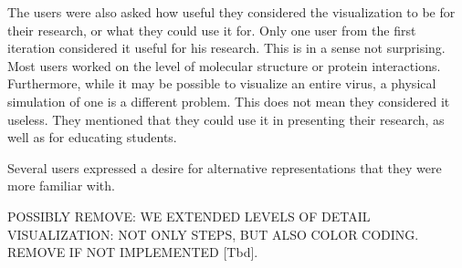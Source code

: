 \documentclass[review,journal]{vgtc}         %
\begin{document}
The users were also asked how useful they considered the visualization to be for their research, or what they could use it for. Only one user from the first iteration considered it useful for his research. This is in a sense not surprising. Most users worked on the level of molecular structure or protein interactions. Furthermore, while it may be possible to visualize an entire virus, a physical simulation of one is a different problem. This does not mean they considered it useless. They mentioned that they could use it in presenting their research, as well as for educating students.


Several users expressed a desire for alternative representations that they were more familiar with. 

POSSIBLY REMOVE: WE EXTENDED LEVELS OF DETAIL VISUALIZATION: NOT ONLY STEPS, BUT ALSO COLOR CODING. REMOVE IF NOT IMPLEMENTED [Tbd].






\end{document}
